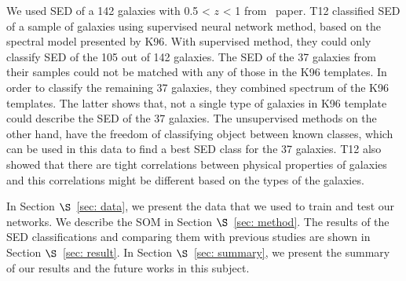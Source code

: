 We used SED of a 142 galaxies with 0.5 < $z$ < 1 from~\citet[][hereafter T12]{Hossein12} paper.
T12 classified SED of a sample of galaxies using supervised neural network method, based on the spectral model presented by K96.
With supervised method, they could only classify SED of the 105 out of 142 galaxies.
The SED of the 37 galaxies from their samples could not be matched with any of those in the K96 templates. 
In order to classify the remaining 37 galaxies, they combined spectrum of the K96 templates.
The latter shows that, not a single type of galaxies in K96 template could describe the SED of the 37 galaxies.
The unsupervised methods on the other hand, have the freedom of classifying object between known classes, which can be used in this data to find a best SED class for the 37 galaxies.
T12 also showed that there are tight correlations between physical properties of galaxies and this correlations might be different based on the types of the galaxies.

 In Section $\S$~\ref{sec: data}, we present the data that we used to train and test our networks. We describe the SOM in Section $\S$~\ref{sec: method}. The results of the SED classifications and comparing them with previous studies are shown in Section $\S$~\ref{sec: result}. In Section $\S$~\ref{sec: summary}, we present the summary of our results and the future works in this subject.
